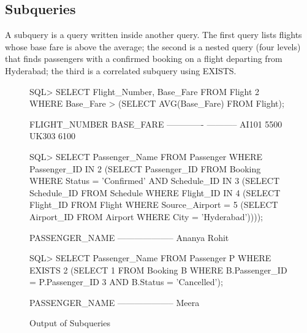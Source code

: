 \documentclass[12pt,a4paper]{article}
\begin{document}
\subsection{Subqueries}
A subquery is a query written inside another query. The first query lists flights whose base fare is above
the average; the second is a nested query (four levels) that finds passengers with a confirmed booking on a
flight departing from Hyderabad; the third is a correlated subquery using EXISTS.
\begin{figure}[H]
\begin{terminal}
SQL> SELECT Flight_Number, Base_Fare FROM Flight
  2  WHERE Base_Fare > (SELECT AVG(Base_Fare) FROM Flight);

FLIGHT_NUMBER   BASE_FARE
------------- -----------
AI101                5500
UK303                6100

SQL> SELECT Passenger_Name FROM Passenger WHERE Passenger_ID IN
  2   (SELECT Passenger_ID FROM Booking WHERE Status = 'Confirmed' AND Schedule_ID IN
  3     (SELECT Schedule_ID FROM Schedule WHERE Flight_ID IN
  4       (SELECT Flight_ID FROM Flight WHERE Source_Airport =
  5         (SELECT Airport_ID FROM Airport WHERE City = 'Hyderabad'))));

PASSENGER_NAME
--------------------
Ananya
Rohit

SQL> SELECT Passenger_Name FROM Passenger P WHERE EXISTS
  2   (SELECT 1 FROM Booking B WHERE B.Passenger_ID = P.Passenger_ID
  3      AND B.Status = 'Cancelled');

PASSENGER_NAME
--------------------
Meera
\end{terminal}
\caption{Output of Subqueries}
\end{figure}
\end{document}
